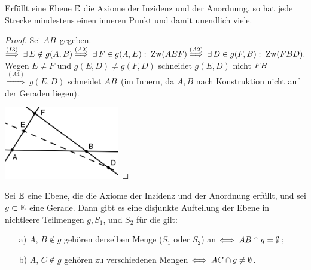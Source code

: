 
\begin{thm}
Erfüllt eine Ebene $\mathbb E$ die Axiome der Inzidenz und der
Anordnung, so hat
jede Strecke mindestens einen inneren Punkt und damit unendlich
viele.
\end{thm}

\begin{proof}
Sei ${AB}$ gegeben.\\
$\stackrel{(I3)}{\Longrightarrow}\;\exists\,E\notin g(A,B)\\
\stackrel{(A2)}{\Longrightarrow}\;\exists\,F\in g(A,E):\;\operatorname{Zw}(AEF)\\
\stackrel{(A2)}{\Longrightarrow}\;\exists\,D\in g(F,B):\;\operatorname{Zw}(FBD).$\\
Wegen $E\neq F$ und $g(E,D)\neq g(F,D)$ schneidet $g(E,D)$ nicht
${FB}$\\
$\stackrel{(A4)}{\Longrightarrow}\; g(E,D)$ schneidet ${AB}$ (im
Innern, da $A,B$ nach Konstruktion nicht auf der Geraden liegen).

\medskip

\centerline{\includegraphics[width=5cm]{BILDER/1-1-05-Satz.png}}

\end{proof}





\begin{thm}\label{thm:satz.s1a}
Sei $\mathbb E$ eine Ebene, die die Axiome der Inzidenz und der
Anordnung erfüllt, und
sei $g\subset \mathbb E$ eine Gerade. 
Dann gibt es eine disjunkte Aufteilung der Ebene in nichtleere Teilmengen $g,
S_1$, und $S_2$ für die gilt:
\begin{enumerate}
    \item[a)] $A,\,B\notin g$ geh\"{o}ren derselben Menge ($S_1$ oder
    $S_2$) an $\Longleftrightarrow\;{AB}\cap g=\emptyset$;
    \item[b)] $A,\,C\notin g$ geh\"{o}ren zu verschiedenen Mengen
    $\Longleftrightarrow\;{AC}\cap g\neq\emptyset$.
\end{enumerate}
\end{thm}


